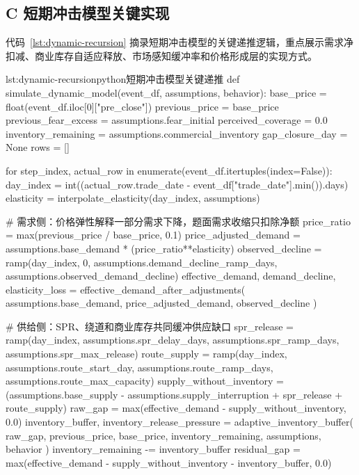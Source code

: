 \subsection*{C 短期冲击模型关键实现}

代码~\ref{lst:dynamic-recursion} 摘录短期冲击模型的关键递推逻辑，重点展示需求净扣减、商业库存自适应释放、市场感知缓冲率和价格形成层的实现方式。

\begin{paperlisting}{lst:dynamic-recursion}{python}{短期冲击模型关键递推}
def simulate_dynamic_model(event_df, assumptions, behavior):
    base_price = float(event_df.iloc[0]["pre_close"])
    previous_price = base_price
    previous_fear_excess = assumptions.fear_initial
    perceived_coverage = 0.0
    inventory_remaining = assumptions.commercial_inventory
    gap_closure_day = None
    rows = []

    for step_index, actual_row in enumerate(event_df.itertuples(index=False)):
        day_index = int((actual_row.trade_date - event_df["trade_date"].min()).days)
        elasticity = interpolate_elasticity(day_index, assumptions)

        # 需求侧：价格弹性解释一部分需求下降，题面需求收缩只扣除净额
        price_ratio = max(previous_price / base_price, 0.1)
        price_adjusted_demand = assumptions.base_demand * (price_ratio**elasticity)
        observed_decline = ramp(day_index, 0, assumptions.demand_decline_ramp_days,
                                assumptions.observed_demand_decline)
        effective_demand, demand_decline, elasticity_loss = effective_demand_after_adjustments(
            assumptions.base_demand, price_adjusted_demand, observed_decline
        )

        # 供给侧：SPR、绕道和商业库存共同缓冲供应缺口
        spr_release = ramp(day_index, assumptions.spr_delay_days,
                           assumptions.spr_ramp_days, assumptions.spr_max_release)
        route_supply = ramp(day_index, assumptions.route_start_day,
                            assumptions.route_ramp_days, assumptions.route_max_capacity)
        supply_without_inventory = (assumptions.base_supply - assumptions.supply_interruption
                                    + spr_release + route_supply)
        raw_gap = max(effective_demand - supply_without_inventory, 0.0)
        inventory_buffer, inventory_release_pressure = adaptive_inventory_buffer(
            raw_gap, previous_price, base_price, inventory_remaining, assumptions, behavior
        )
        inventory_remaining -= inventory_buffer
        residual_gap = max(effective_demand - supply_without_inventory - inventory_buffer, 0.0)


\end{paperlisting}

